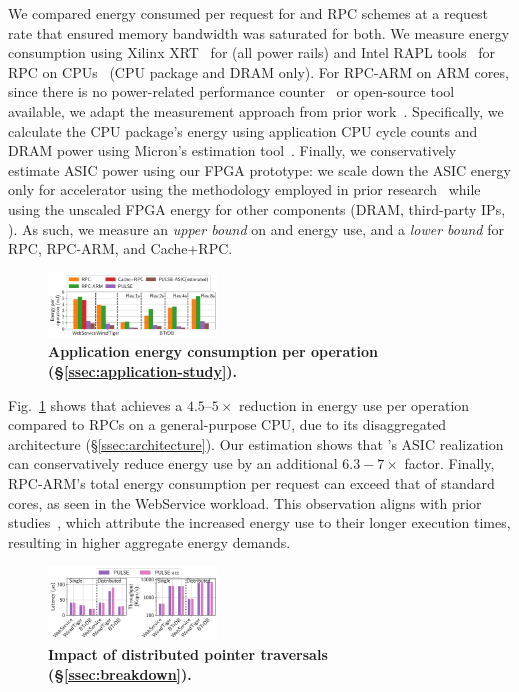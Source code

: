  We compared energy consumed per request for \name and RPC schemes at a request rate that ensured memory bandwidth was saturated for both. We measure energy consumption using Xilinx XRT~\cite{xilinx_xrt} for \name (all power rails) and Intel RAPL tools~\cite{intel_rapl} for RPC on CPUs~\cite{intelprocessor} (CPU package and DRAM only). For RPC-ARM on ARM cores, since there is no power-related performance counter~\cite{armv8registers} or open-source tool available, we adapt the measurement approach from prior work~\cite{clio}. Specifically, we calculate the CPU package's energy using application CPU cycle counts and DRAM power using Micron's estimation tool~\cite{micron}. Finally, we conservatively estimate ASIC power using our FPGA prototype: we scale down the ASIC energy only for \name accelerator using the methodology employed in prior research~\cite{asicpower} while using the unscaled FPGA energy for other components (DRAM, third-party IPs, \etc). As such, we measure an \emph{upper bound} on \name and \nameasic energy use, and a \emph{lower bound} for RPC, RPC-ARM, and Cache+RPC.

\begin{figure}[t]
\centering
\includegraphics[width=0.4\textwidth]{fig/pulse/power.pdf}
\vspace{-1em}
\caption{\textbf{Application energy consumption per operation (\S\ref{ssec:application-study}).}}
\label{fig:eval_energy}%
\end{figure}

Fig.~\ref{fig:eval_energy} shows that \name achieves a $4.5$--$5\times$ reduction in energy use per operation compared to RPCs on a general-purpose CPU, due to its disaggregated architecture (\S\ref{ssec:architecture}). Our estimation shows that \name's ASIC realization can conservatively reduce energy use by an additional $6.3-7\times$ factor. 
Finally, RPC-ARM's total energy consumption per request can exceed that of standard cores, as seen in the WebService workload. This observation aligns with prior studies~\cite{clio}, which attribute the increased energy use to their longer execution times, resulting in higher aggregate energy demands.

\begin{figure}[t]
\centering
\includegraphics[width=0.4\textwidth]{fig/pulse/breakdown.pdf}%
\vspace{-1em}
\caption{\textbf{Impact of distributed pointer traversals (\S\ref{ssec:breakdown}).}}
\label{fig:eval_breakdown}
\end{figure}

